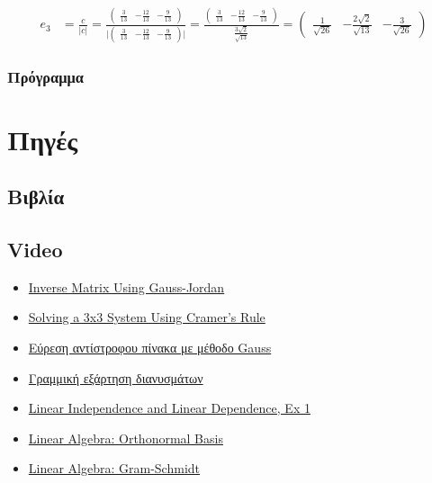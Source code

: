\documentclass[12pt, fleqn, leqno]{extreport}
\begin{document}
\begin{equation}
    \begin{split}
        e_{3} &= \frac{c}{\vert c \vert} =
        \frac{
            \begin{pmatrix}
                \frac{3}{13} & -\frac{12}{13} & -\frac{9}{13}
            \end{pmatrix}
        }{
            \vert
            \begin{pmatrix}
                \frac{3}{13} & -\frac{12}{13} & -\frac{9}{13}
            \end{pmatrix}
            \vert
        } =
        \frac{
            \begin{pmatrix}
                \frac{3}{13} & -\frac{12}{13} & -\frac{9}{13}
            \end{pmatrix}
        }{
            \frac{3\sqrt{2}}{\sqrt{13}}
        } =
        \begin{pmatrix}
            \frac{1}{\sqrt{26}} & -\frac{2\sqrt{2}}{\sqrt{13}} & -\frac{3}{\sqrt{26}}
        \end{pmatrix}
    \end{split}
\end{equation}

\subsection{Πρόγραμμα}

\chapter{Πηγές}
\newpage

\section{Βιβλία}
\section{Video}
\begin{itemize}
    \item \href{https://www.youtube.com/watch?v=cJg2AuSFdjw}{Inverse Matrix Using Gauss-Jordan}
    \item \href{https://youtu.be/X5rDjbp0t6s}{Solving a 3x3 System Using Cramer's Rule}
    \item \href{https://youtu.be/0vB1sgebS9c}{Εύρεση αντίστροφου πίνακα με μέθοδο Gauss}
    \item \href{https://youtu.be/Gmt1fmlrEto}{Γραμμική εξάρτηση διανυσμάτων}
    \item \href{https://youtu.be/yLi8RxqfowA}{Linear Independence and Linear Dependence, Ex 1}
    \item \href{https://www.youtube.com/watch?v=ZJu26chXEiw}{Linear Algebra: Orthonormal Basis}
    \item \href{https://www.youtube.com/watch?v=Aslf3KGq2UE}{Linear Algebra: Gram-Schmidt}
\end{itemize}
\end{document}
